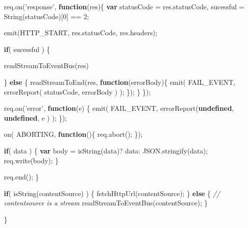 \documentclass[12pt, ]{article}
\newenvironment{Shaded}{}{}
\newcommand{\KeywordTok}[1]{\textcolor[rgb]{0.00,0.44,0.13}{\textbf{{#1}}}}
\newcommand{\DecValTok}[1]{\textcolor[rgb]{0.25,0.63,0.44}{{#1}}}
\newcommand{\StringTok}[1]{\textcolor[rgb]{0.25,0.44,0.63}{{#1}}}
\newcommand{\CommentTok}[1]{\textcolor[rgb]{0.38,0.63,0.69}{\textit{{#1}}}}
\newcommand{\OtherTok}[1]{\textcolor[rgb]{0.00,0.44,0.13}{{#1}}}
\newcommand{\FunctionTok}[1]{\textcolor[rgb]{0.02,0.16,0.49}{{#1}}}
\newcommand{\NormalTok}[1]{{#1}}
\begin{document}
\begin{Shaded}
\begin{Highlighting}[]
      \OtherTok{req}\NormalTok{.}\FunctionTok{on}\NormalTok{(}\StringTok{'response'}\NormalTok{, }\KeywordTok{function}\NormalTok{(res)\{}
         \KeywordTok{var} \NormalTok{statusCode = }\OtherTok{res}\NormalTok{.}\FunctionTok{statusCode}\NormalTok{,}
             \NormalTok{sucessful = }\FunctionTok{String}\NormalTok{(statusCode)[}\DecValTok{0}\NormalTok{] == }\DecValTok{2}\NormalTok{;}
                                                   
         \FunctionTok{emit}\NormalTok{(HTTP_START, }\OtherTok{res}\NormalTok{.}\FunctionTok{statusCode}\NormalTok{, }\OtherTok{res}\NormalTok{.}\FunctionTok{headers}\NormalTok{);                                }
                                
         \KeywordTok{if}\NormalTok{( sucessful ) \{          }
               
            \FunctionTok{readStreamToEventBus}\NormalTok{(res)}
            
         \NormalTok{\} }\KeywordTok{else} \NormalTok{\{}
            \FunctionTok{readStreamToEnd}\NormalTok{(res, }\KeywordTok{function}\NormalTok{(errorBody)\{}
               \FunctionTok{emit}\NormalTok{( }
                  \NormalTok{FAIL_EVENT, }
                  \FunctionTok{errorReport}\NormalTok{( statusCode, errorBody )}
               \NormalTok{);}
            \NormalTok{\});}
         \NormalTok{\}      }
      \NormalTok{\});}
      
      \OtherTok{req}\NormalTok{.}\FunctionTok{on}\NormalTok{(}\StringTok{'error'}\NormalTok{, }\KeywordTok{function}\NormalTok{(e) \{}
         \FunctionTok{emit}\NormalTok{( }
            \NormalTok{FAIL_EVENT, }
            \FunctionTok{errorReport}\NormalTok{(}\KeywordTok{undefined}\NormalTok{, }\KeywordTok{undefined}\NormalTok{, e )}
         \NormalTok{);}
      \NormalTok{\});}
      
      \FunctionTok{on}\NormalTok{( ABORTING, }\KeywordTok{function}\NormalTok{()\{              }
         \OtherTok{req}\NormalTok{.}\FunctionTok{abort}\NormalTok{();}
      \NormalTok{\});}
         
      \KeywordTok{if}\NormalTok{( data ) \{}
         \KeywordTok{var} \NormalTok{body = }\FunctionTok{isString}\NormalTok{(data)? data: }\OtherTok{JSON}\NormalTok{.}\FunctionTok{stringify}\NormalTok{(data);}
         \OtherTok{req}\NormalTok{.}\FunctionTok{write}\NormalTok{(body);}
      \NormalTok{\}}
      
      \OtherTok{req}\NormalTok{.}\FunctionTok{end}\NormalTok{();         }
   \NormalTok{\}}
   
   \KeywordTok{if}\NormalTok{( }\FunctionTok{isString}\NormalTok{(contentSource) ) \{}
      \FunctionTok{fetchHttpUrl}\NormalTok{(contentSource);}
   \NormalTok{\} }\KeywordTok{else} \NormalTok{\{}
      \CommentTok{// contentsource is a stream}
      \FunctionTok{readStreamToEventBus}\NormalTok{(contentSource);   }
   \NormalTok{\}}

\NormalTok{\}}
\end{Highlighting}
\end{Shaded}
\end{document}
